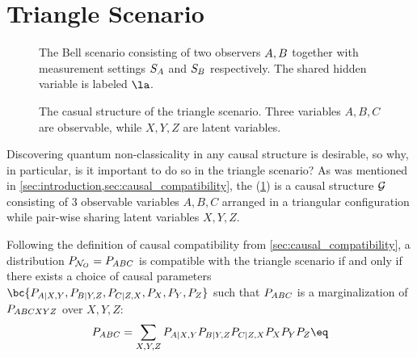 \documentclass[aps, 10pt, english, twoside, pra, nofootinbib, tightenlines, longbibliography]{revtex4-1}
\begin{document}
    \section{Triangle Scenario}
    \label{sec:triangle_scenario}

    \begin{figure}
    \begin{center}
        \begin{minipage}[t]{.48\textwidth}
            \centering
            \scalebox{1.0}{}
            \caption{The Bell scenario consisting of two observers $A, B$ together with measurement settings $S_{A}$ and $S_{B}$ respectively. The shared hidden variable is labeled $\la$.}
            \label{fig:bell_scenario}
        \end{minipage}\hspace{0.04\textwidth}%
        \begin{minipage}[t]{.48\textwidth}
            \centering
            \scalebox{1.0}{}
            \caption{The casual structure of the triangle scenario. Three variables $A,B,C$ are observable, while $X, Y, Z$ are latent variables.}
            \label{fig:triangle_scenario}
        \end{minipage}
    \end{center}
    \end{figure}
    Discovering quantum non-classicality in any causal structure is desirable, so why, in particular, is it important to do so in the triangle scenario? As was mentioned in \cref{sec:introduction,sec:causal_compatibility}, the  (\cref{fig:triangle_scenario}) is a causal structure $\mathcal{G}$ consisting of $3$ observable variables $A, B, C$ arranged in a triangular configuration while pair-wise sharing latent variables $X, Y, Z$.

    Following the definition of causal compatibility from \cref{sec:causal_compatibility}, a distribution $\prob[\nodes_{O}] = \prob[ABC]$ is compatible with the triangle scenario if and only if there exists a choice of causal parameters $\bc{\prob[A|X,Y],\prob[B|Y,Z],\prob[C|Z,X],\prob[X],\prob[Y],\prob[Z]}$ such that 
    $\prob[ABC]$ is a marginalization of $\prob[ABCXYZ]$ over $X, Y, Z$:
    \[ \prob[ABC] = \sum_{X,Y,Z}\prob[A|X,Y]\prob[B|Y,Z]\prob[C|Z,X]\prob[X]\prob[Y]\prob[Z] \eq \label{eq:triangle_compatibility} \]
\end{document}
